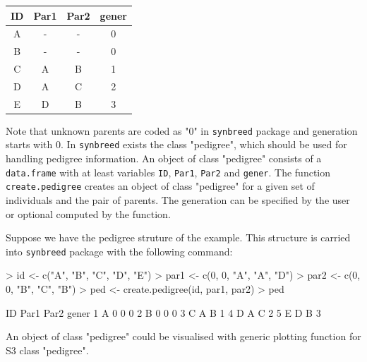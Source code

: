 \documentclass[a4paper,11pt]{article}
\begin{document}
\begin{table}[!h]
\centering
\begin{tabular}{cccc}
\hline
ID & Par1 & Par2 & gener \\
\hline
A & - & - & 0 \\
B & - & - & 0 \\
C & A & B & 1 \\
D & A & C & 2 \\
E & D & B & 3 \\
\hline
\end{tabular}
\end{table}

Note that unknown parents are coded as "0" in \texttt{synbreed} package and generation starts with 0. In \texttt{synbreed} exists the class "pedigree", which 
should be used for handling pedigree information. An object of class "pedigree" consists of a \texttt{data.frame} with at least variables \texttt{ID}, \texttt{Par1}, \texttt{Par2} and \texttt{gener}.
The function \texttt{create.pedigree} creates an object of class  "pedigree" for a given set of individuals and the pair of parents. The generation can be specified by the user or optional computed by the function.

Suppose we have the pedigree struture of the example. This structure is carried into \texttt{synbreed} package with the following command:
\begin{Schunk}
\begin{Sinput}
> id <- c("A", "B", "C", "D", "E")
> par1 <- c(0, 0, "A", "A", "D")
> par2 <- c(0, 0, "B", "C", "B")
> ped <- create.pedigree(id, par1, par2)
> ped
\end{Sinput}
\begin{Soutput}
  ID Par1 Par2 gener
1  A    0    0     0
2  B    0    0     0
3  C    A    B     1
4  D    A    C     2
5  E    D    B     3
\end{Soutput}
\end{Schunk}
An object of class "pedigree" could be visualised with generic plotting function for S3 class "pedigree".
 
\end{document}
